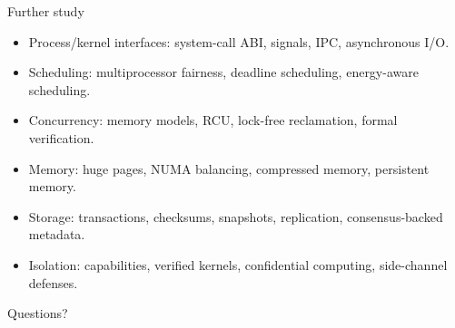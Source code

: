 \documentclass[aspectratio=169,11pt]{beamer}
\begin{document}
\begin{frame}{Further study}
  \begin{itemize}
    \item Process/kernel interfaces: system-call ABI, signals, IPC, asynchronous I/O.
    \item Scheduling: multiprocessor fairness, deadline scheduling, energy-aware scheduling.
    \item Concurrency: memory models, RCU, lock-free reclamation, formal verification.
    \item Memory: huge pages, NUMA balancing, compressed memory, persistent memory.
    \item Storage: transactions, checksums, snapshots, replication, consensus-backed metadata.
    \item Isolation: capabilities, verified kernels, confidential computing, side-channel defenses.
  \end{itemize}
  \begin{center}
    \Large Questions?
  \end{center}
\end{frame}
\end{document}
